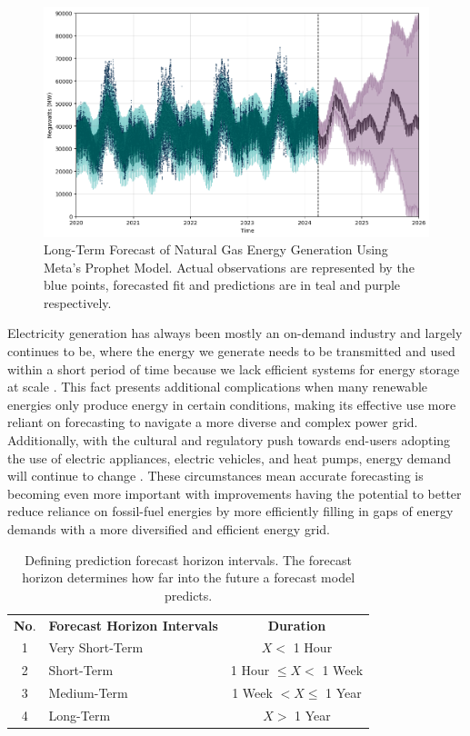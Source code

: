 \documentclass[sigconf]{acmart}
\begin{document}
  \begin{figure}[hbt!]
    \includegraphics[width=\columnwidth]{Images/Forecast.png}
    \caption{Long-Term Forecast of Natural Gas Energy Generation Using Meta's Prophet Model. Actual observations are represented by the blue points, forecasted fit and predictions are in teal and purple respectively.}
    \Description{}
    \label{fig:forecast}
  \end{figure}

Electricity generation has always been mostly an on-demand industry and largely continues to be, where the energy we generate needs to be transmitted and used within a short period of time because we lack efficient systems for energy storage at scale \cite{Lai21}. This fact presents additional complications when many renewable energies only produce energy in certain conditions, making its effective use more reliant on forecasting to navigate a more diverse and complex power grid. Additionally, with the cultural and regulatory push towards end-users adopting the use of electric appliances, electric vehicles, and heat pumps, energy demand will continue to change \cite{Archsmith22}. These circumstances mean accurate forecasting is becoming even more important with improvements having the potential to better reduce reliance on fossil-fuel energies by more efficiently filling in gaps of energy demands with a more diversified and efficient energy grid.

\begin{table}
\centering
\caption{Defining prediction forecast horizon intervals. The forecast horizon determines how far into the future a forecast model predicts.}
\begin{tabular}{clc}
\toprule
\hfill \textbf{No}. & \hfil \textbf{Forecast Horizon Intervals} & \textbf{Duration}\\
\cmidrule(lr){1-1}\cmidrule(rl){2-2}\cmidrule(rl){3-3}
  1 & Very Short-Term & $ X < $ 1 Hour \\
  2 & Short-Term  & 1 Hour $ \leq X < $ 1 Week  \\   
  3 & Medium-Term & 1 Week $ < X \leq $ 1 Year  \\   
  4 & Long-Term & $ X > $ 1 Year  \\ 
  \bottomrule
\end{tabular}
\end{table}
\end{document}
